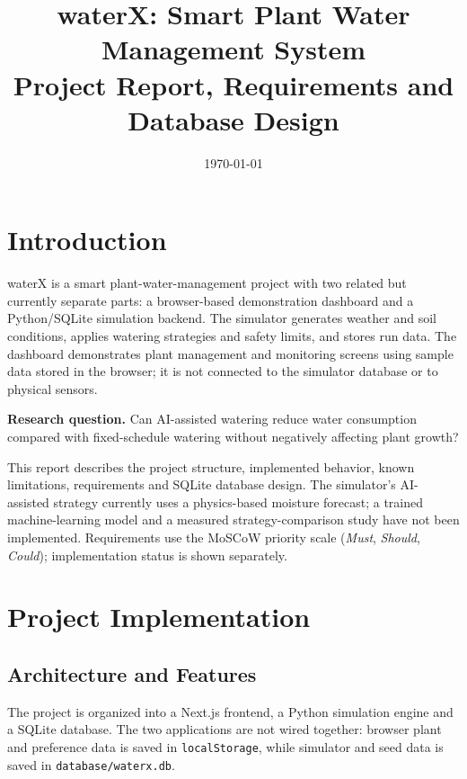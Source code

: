 \documentclass[11pt,a4paper]{article}
\title{waterX: Smart Plant Water Management System\\[2pt]
       \large Project Report, Requirements and Database Design}
\author{}
\date{\today}
\newcommand{\cn}[1]{\texttt{#1}}   %
\begin{document}
\maketitle
\tableofcontents
\bigskip

\section{Introduction}
waterX is a smart plant-water-management project with two related but
currently separate parts: a browser-based demonstration dashboard and a
Python/SQLite simulation backend. The simulator generates weather and soil
conditions, applies watering strategies and safety limits, and stores run data.
The dashboard demonstrates plant management and monitoring screens using
sample data stored in the browser; it is not connected to the simulator
database or to physical sensors.

\textbf{Research question.} Can AI-assisted watering reduce water consumption
compared with fixed-schedule watering without negatively affecting plant
growth?

This report describes the project structure, implemented behavior, known
limitations, requirements and SQLite database design. The simulator's
AI-assisted strategy currently uses a physics-based moisture forecast; a
trained machine-learning model and a measured strategy-comparison study have
not been implemented. Requirements use the MoSCoW priority scale
(\emph{Must}, \emph{Should}, \emph{Could}); implementation status is shown
separately.

\section{Project Implementation}

\subsection{Architecture and Features}
The project is organized into a Next.js frontend, a Python simulation engine
and a SQLite database. The two applications are not wired together: browser
plant and preference data is saved in \cn{localStorage}, while simulator and
seed data is saved in \cn{database/waterx.db}.
\end{document}
